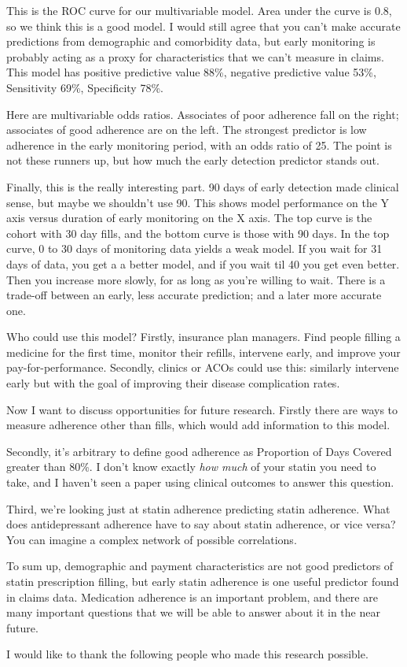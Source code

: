 \documentclass[12pt]{report}
\begin{document}
\begin{large}
This is the ROC curve for our multivariable model. Area under the
curve is 0.8, so we think this is a good model. I would still agree
that you can't make accurate predictions from demographic and
comorbidity data, but early monitoring is probably acting as a proxy
for characteristics that we can't measure in claims. This model has
positive predictive value 88\%, negative predictive value 53\%,
Sensitivity 69\%, Specificity 78\%. %

Here are multivariable odds ratios. Associates of poor adherence fall
on the right; associates of good adherence are on the left. The
strongest predictor is low adherence in the early monitoring period,
with an odds ratio of 25. The point is not these runners up, but how
much the early detection predictor stands out. %

Finally, this is the really interesting part. 90 days of early
detection made clinical sense, but maybe we shouldn't use 90. This
shows model performance on the Y axis versus duration of early
monitoring on the X axis. The top curve is the cohort with 30 day
fills, and the bottom curve is those with 90 days. In the top curve, 0
to 30 days of monitoring data yields a weak model. If you wait for 31
days of data, you get a a better model, and if you wait til 40 you get
even better. Then you increase more slowly, for as long as you're
willing to wait. There is a trade-off between an early, less accurate
prediction; and a later more accurate one. %

Who could use this model? Firstly, insurance plan managers. Find
people filling a medicine for the first time, monitor their refills,
intervene early, and improve your pay-for-performance. Secondly,
clinics or ACOs could use this: similarly intervene early but with the
goal of improving their disease complication rates. %

Now I want to discuss opportunities for future research. First\-ly
there are ways to measure adherence other than fills, which would add
information to this model.

Secondly, it's arbitrary to define good adherence as Proportion of
Days Covered greater than 80\%. I don't know exactly \emph{how much}
of your statin you need to take, and I haven't seen a paper using
clinical outcomes to answer this question.

Third, we're looking just at statin adherence predicting statin
adherence. What does antidepressant adherence have to say about statin
adherence, or vice versa? You can imagine a complex network of
possible correlations.

To sum up, demographic and payment characteristics are not good
predictors of statin prescription filling, but early statin adherence
is one useful predictor found in claims data. Medication adherence is
an important problem, and there are many important questions that we
will be able to answer about it in the near future.

I would like to thank the following people who made this research
possible. %

\end{large}
\end{document}
